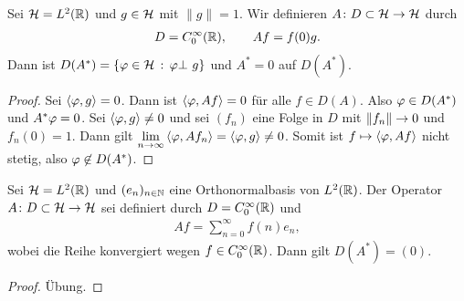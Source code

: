 \begin{bsp*}
\begin{bspenum}
\item Sei $\mathcal{H} = L^2(\mathbb{R})$ und $g\in\mathcal{H}$ mit $\|g\|=1$. Wir definieren
$A \colon D \subset \mathcal{H} \to \mathcal{H}$ durch
\begin{align*}
D = C_{0}^{\infty}(\mathbb{R}),\qquad Af = f(0)g.
\end{align*}
Dann ist $D(A^*)=\left\{ \varphi\in \mathcal{H}\,:\,\varphi \bot\ g\right\}$ und $A^*=0$ auf $D(A^*)$.
\begin{proof}
Sei $\left\langle\varphi,g\right\rangle=0$. Dann ist $\left\langle\varphi,Af\right\rangle=0$ f\"ur alle $f\in
D(A)$. Also $\varphi\in D(A^*)$ und $A^*\varphi=0$.
Sei  $\left\langle\varphi,g\right\rangle\neq 0$ und sei $(f_n)$ eine Folge in $D$ mit
$\left\|f_n\right\|\to 0$ und $f_n(0)=1$. Dann gilt
$\lim\limits_{n\to\infty}\left\langle\varphi,Af_n\right\rangle = \left\langle\varphi,g\right\rangle\neq 0$. Somit ist
$f\mapsto \left\langle\varphi,Af\right\rangle$ nicht stetig, also $\varphi \not\in D(A^*)$.\qedhere
\end{proof}

\item
Sei $\mathcal{H} = L^2(\mathbb{R})$ und $(e_n)_{n \in \mathbb{N}}$ eine Orthonormalbasis
von $L^2(\mathbb{R})$. Der Operator $A \colon D \subset \mathcal{H} \to \mathcal{H}$ sei
definiert durch
$D = C_{0}^{\infty}(\mathbb{R})$ und
\begin{align*}
Af = \sum_{n=0}^{\infty} f(n) e_n,
\end{align*}
wobei die Reihe konvergiert wegen $f \in C_{0}^{\infty}(\mathbb{R})$.
Dann gilt $D(A^{*}) = (0)$.

\begin{proof}
Übung.\qedhere
\end{proof}
\end{bspenum}
\end{bsp*}


